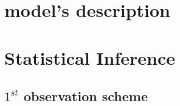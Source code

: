 \begin{appendices}
\section{model's description}
\label{app:desc}


\section{Statistical Inference}
\subsection{$1^{st}$ observation scheme}
\label{app:inf1}

\end{appendices}









 
 
 
 
